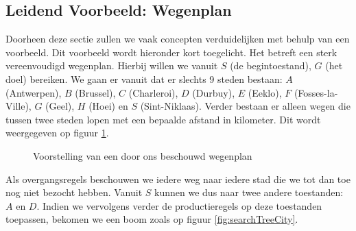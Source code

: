 \subsection{Leidend Voorbeeld: Wegenplan}
\begin{leftbar}
Doorheen deze sectie zullen we vaak concepten verduidelijken met behulp van een voorbeeld. Dit voorbeeld wordt hieronder kort toegelicht. Het betreft een sterk vereenvoudigd wegenplan. Hierbij willen we vanuit $S$ (de begintoestand), $G$ (het doel) bereiken. We gaan er vanuit dat er slechts 9 steden bestaan: $A$ (Antwerpen), $B$ (Brussel), $C$ (Charleroi), $D$ (Durbuy), $E$ (Eeklo), $F$ (Fosses-la-Ville), $G$ (Geel), $H$ (Hoei) en $S$ (Sint-Niklaas). Verder bestaan er alleen wegen die tussen twee steden lopen met een bepaalde afstand in kilometer. Dit wordt weergegeven op figuur \ref{fig:searchMapCity}.
\end{leftbar}
\begin{figure}[htb]
\centering
{}
\caption{Voorstelling van een door ons beschouwd wegenplan}
\label{fig:searchMapCity}
\end{figure}
\begin{leftbar}
Als overgangsregels beschouwen we iedere weg naar iedere stad die we tot dan toe nog niet bezocht hebben. Vanuit $S$ kunnen we dus naar twee andere toestanden: $A$ en $D$. Indien we vervolgens verder de productieregels op deze toestanden toepassen, bekomen we een boom zoals op figuur \ref{fig:searchTreeCity}.
\end{leftbar}
